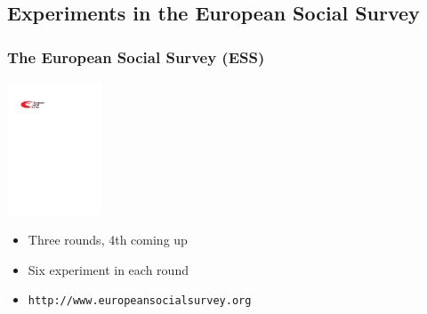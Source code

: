 \documentclass{beamer}
\begin{document}
\subsection{Experiments in the European Social Survey}

\begin{frame}
	\frametitle{The European Social Survey (ESS)}

	\includegraphics[width=2.8cm]{i/ess-logo.pdf}
	\begin{itemize}
		\item Three rounds, 4th coming up
		\item Six experiment in each round
		\item \texttt{http://www.europeansocialsurvey.org}
	\end{itemize}
\end{frame}
\end{document}
